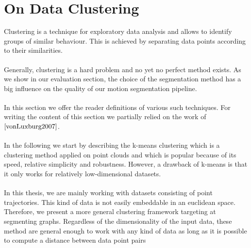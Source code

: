 \section{On Data Clustering}
\label{sec:on_data_clustering}
Clustering is a technique for exploratory data analysis and allows to identify groups of similar behaviour. This is achieved by separating data points according to their similarities. \\ \\
Generally, clustering is a hard problem and no yet no perfect method exists. As we show in our evaluation section, the choice of the segmentation method has a big influence on the quality of our motion segmentation pipeline. \\ \\
In this section we offer the reader definitions of various such techniques. For writing the content of this section we partially relied on the work of $\cite{vonLuxburg2007}$. \\ \\
In the following we start by describing the k-means clustering which is a clustering method applied on point clouds and which is popular because of its speed, relative simplicity and robustness. However, a drawback of k-means is that it only works for relatively low-dimensional datasets. \\ \\ 
In this thesis, we are mainly working with datasets consisting of point trajectories. This kind of data is not easily embeddable in an euclidean space. Therefore, we present a more general clustering framework targeting at segmenting graphs. Regardless of the dimensionality of the input data, these method are general enough to work with any kind of data as long as it is possible to compute a distance between data point pairs

